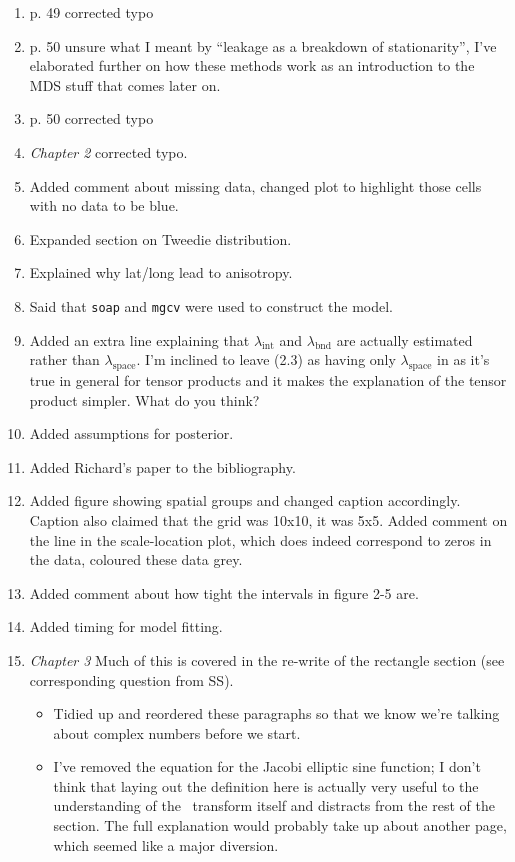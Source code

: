 \begin{enumerate}
\item p. 49 corrected typo
\item p. 50 unsure what I meant by ``leakage as a breakdown of stationarity'', I've elaborated further on how these methods work as an introduction to the MDS stuff that comes later on.
\item p. 50 corrected typo
\item \textit{Chapter 2}  corrected typo.
\item {} Added comment about missing data, changed plot to highlight those cells with no data to be blue.
\item {} Expanded section on Tweedie distribution.
\item {} Explained why lat/long lead to anisotropy.
\item {} Said that \texttt{soap} and \texttt{mgcv} were used to construct the model.
\item {} Added an extra line explaining that $\lambda_\text{int}$ and $\lambda_\text{bnd}$ are actually estimated rather than $\lambda_\text{space}$. I'm inclined to leave (2.3) as having only $\lambda_\text{space}$ in as it's true in general for tensor products and it makes the explanation of the tensor product simpler. What do you think?
\item {} Added assumptions for posterior.
\item {} Added Richard's paper to the bibliography.
\item {} Added figure showing spatial groups and changed caption accordingly. Caption also claimed that the grid was 10x10, it was 5x5. Added comment on the line in the scale-location plot, which does indeed correspond to zeros in the data, coloured these data grey.
\item {} Added comment about how tight the intervals in figure 2-5 are.
\item {} Added timing for model fitting.
\item \textit{Chapter 3}  Much of this is covered in the re-write of the rectangle section (see corresponding question from SS).
\begin{itemize}
	\item {} Tidied up and reordered these paragraphs so that we know we're talking about complex numbers before we start.
	\item {} I've removed the equation for the Jacobi elliptic sine function; I don't think that laying out the definition here is actually very useful to the understanding of the \sch\ transform itself and distracts from the rest of the section. The full explanation would probably take up about another page, which seemed like a major diversion.

\end{itemize}
\end{enumerate}

